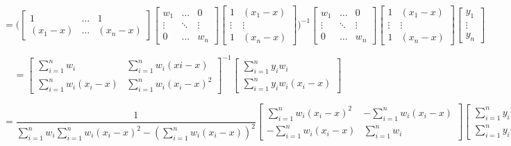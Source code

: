 \documentclass[10pt]{article}
\begin{document}
\begin{enumerate}[label=(\Alph*)]
        $$=\Bigg(
        \begin{bmatrix}
        1 & \dots & 1 \\ 
        (x_1-x) & \dots & (x_n-x)
        \end{bmatrix}
        \begin{bmatrix} 
        w_1 & \dots & 0 \\ 
        \vdots & \ddots & \vdots \\ 
        0 & \dots & w_n 
        \end{bmatrix}
        \begin{bmatrix}1&(x_1-x)\\ 
        \vdots & \vdots \\ 
        1 & (x_n - x) \end{bmatrix}
        \Bigg)^{-1}
        \begin{bmatrix} 
        w_1 & \dots & 0 \\ 
        \vdots & \ddots & \vdots \\ 
        0 & \dots & w_n 
        \end{bmatrix}
        \begin{bmatrix} 
        1 &(x_1-x) \\ 
        \vdots & \vdots \\ 
        1 & (x_n - x) \end{bmatrix}
        \begin{bmatrix}
        y_1\\
        \vdots\\
        y_n
        \end{bmatrix}
        $$

        $$=\begin{bmatrix}
        \sum_{i=1}^nw_i & \sum_{i=1}^{n}w_i(xi-x) \\
        \sum_{i=1}^{n}w_i(x_i-x) & \sum_{i=1}^nw_i(x_i-x)^2
        \end{bmatrix}^{-1}
        \begin{bmatrix}
        \sum_{i=1}^{n}y_iw_i \\
        \sum_{i=1}^n y_iw_i(x_i-x)
        \end{bmatrix}$$

        $$=\frac{1}{\sum_{i=1}^nw_i \sum_{i=1}^nw_i(x_i-x)^2 - (\sum_{i=1}^nw_i (x_i-x))^2}
        \begin{bmatrix}
        \sum_{i=1}^nw_i(x_i-x)^2 & -\sum_{i=1}^{n}w_i(x_i-x) \\
        -\sum_{i=1}^{n}w_i(x_i-x) & \sum_{i=1}^nw_i     
        \end{bmatrix}
        \begin{bmatrix}
        \sum_{i=1}^{n}y_iw_i \\
        \sum_{i=1}^n y_iw_i(x_i-x)
        \end{bmatrix}$$


\end{enumerate}
\end{document}
